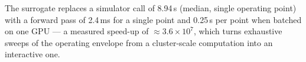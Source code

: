 The surrogate replaces a simulator call of 8.94\,s (median,
single operating point) with a forward pass of
2.4\,ms for a single point and
0.25\,\textmu s per point when batched on one GPU ---
a measured speed-up of $\approx 3.6
\times 10^{7}$, which turns exhaustive sweeps of the
operating envelope from a cluster-scale computation into an interactive one.
